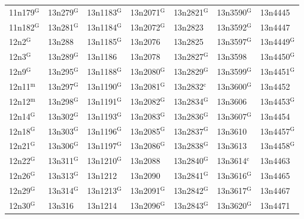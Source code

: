\documentclass[12pt, oneside]{amsart}
\begin{document}
{\begin{longtable}{*{7}{>{\raggedright\arraybackslash}p{}}}
11n179$^{\mathrm{G}}$ & 13n279$^{\mathrm{G}}$ & 13n1183$^{\mathrm{G}}$ & 13n2071$^{\mathrm{G}}$ & 13n2821$^{\mathrm{G}}$ & 13n3590$^{\mathrm{G}}$ & 13n4445 \\
11n182$^{\mathrm{G}}$ & 13n281$^{\mathrm{G}}$ & 13n1184$^{\mathrm{G}}$ & 13n2072$^{\mathrm{G}}$ & 13n2823 & 13n3592$^{\mathrm{G}}$ & 13n4447 \\
12n2$^{\mathrm{G}}$ & 13n288 & 13n1185$^{\mathrm{G}}$ & 13n2076 & 13n2825 & 13n3597$^{\mathrm{G}}$ & 13n4449$^{\mathrm{G}}$ \\
12n3$^{\mathrm{G}}$ & 13n289$^{\mathrm{G}}$ & 13n1186 & 13n2078 & 13n2827$^{\mathrm{G}}$ & 13n3598 & 13n4450$^{\mathrm{G}}$ \\
12n9$^{\mathrm{G}}$ & 13n295$^{\mathrm{G}}$ & 13n1188$^{\mathrm{G}}$ & 13n2080$^{\mathrm{G}}$ & 13n2829$^{\mathrm{G}}$ & 13n3599$^{\mathrm{G}}$ & 13n4451$^{\mathrm{G}}$ \\
12n11$^{\mathrm{m}}$ & 13n297$^{\mathrm{G}}$ & 13n1190$^{\mathrm{G}}$ & 13n2081$^{\mathrm{G}}$ & 13n2832$^{\mathrm{c}}$ & 13n3600$^{\mathrm{G}}$ & 13n4452 \\
12n12$^{\mathrm{m}}$ & 13n298$^{\mathrm{G}}$ & 13n1191$^{\mathrm{G}}$ & 13n2082$^{\mathrm{G}}$ & 13n2834$^{\mathrm{G}}$ & 13n3606 & 13n4453$^{\mathrm{G}}$ \\
12n14$^{\mathrm{G}}$ & 13n302$^{\mathrm{G}}$ & 13n1193$^{\mathrm{G}}$ & 13n2083$^{\mathrm{G}}$ & 13n2836$^{\mathrm{G}}$ & 13n3607$^{\mathrm{G}}$ & 13n4454 \\
12n18$^{\mathrm{G}}$ & 13n303$^{\mathrm{G}}$ & 13n1196$^{\mathrm{G}}$ & 13n2085$^{\mathrm{G}}$ & 13n2837$^{\mathrm{G}}$ & 13n3610 & 13n4457$^{\mathrm{G}}$ \\
12n21$^{\mathrm{G}}$ & 13n306$^{\mathrm{G}}$ & 13n1197$^{\mathrm{G}}$ & 13n2086$^{\mathrm{G}}$ & 13n2838$^{\mathrm{G}}$ & 13n3613 & 13n4458$^{\mathrm{G}}$ \\
12n22$^{\mathrm{G}}$ & 13n311$^{\mathrm{G}}$ & 13n1210$^{\mathrm{G}}$ & 13n2088 & 13n2840$^{\mathrm{G}}$ & 13n3614$^{\mathrm{c}}$ & 13n4463 \\
12n26$^{\mathrm{G}}$ & 13n313$^{\mathrm{G}}$ & 13n1212 & 13n2090 & 13n2841$^{\mathrm{G}}$ & 13n3616$^{\mathrm{G}}$ & 13n4465 \\
12n29$^{\mathrm{G}}$ & 13n314$^{\mathrm{G}}$ & 13n1213$^{\mathrm{G}}$ & 13n2091$^{\mathrm{G}}$ & 13n2842$^{\mathrm{G}}$ & 13n3617$^{\mathrm{G}}$ & 13n4467 \\
12n30$^{\mathrm{G}}$ & 13n316 & 13n1214 & 13n2096$^{\mathrm{G}}$ & 13n2843$^{\mathrm{G}}$ & 13n3620$^{\mathrm{G}}$ & 13n4471 \\

\end{longtable}}
\end{document}
